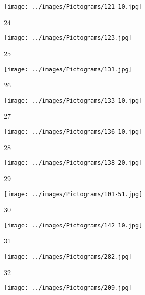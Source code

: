 \begin{figure}[H]
\begin{subfigure}[b]{0.1\textwidth}
  \centering
  \texttt{[image: ../images/Pictograms/121-10.jpg]}
  \caption{24}
\end{subfigure}
\hspace{3em}%
\begin{subfigure}[b]{0.1\textwidth}
  \centering
  \texttt{[image: ../images/Pictograms/123.jpg]}
  \caption{25}
\end{subfigure}
\hspace{3em}%
\begin{subfigure}[b]{0.1\textwidth}
  \centering
  \texttt{[image: ../images/Pictograms/131.jpg]}
  \caption{26}
\end{subfigure}
\hspace{3em}%
\begin{subfigure}[b]{0.1\textwidth}
\centering
\texttt{[image: ../images/Pictograms/133-10.jpg]}
\caption{27}
\end{subfigure}
\hspace{3em}%
\begin{subfigure}[b]{0.1\textwidth}
 \centering
 \texttt{[image: ../images/Pictograms/136-10.jpg]}
 \caption{28}
\end{subfigure}
\hspace{3em}%
\begin{subfigure}[b]{0.1\textwidth}
 \centering
 \texttt{[image: ../images/Pictograms/138-20.jpg]}
 \caption{29}
\end{subfigure}
\hspace{3em}%
\begin{subfigure}[b]{0.1\textwidth}
 \centering
 \texttt{[image: ../images/Pictograms/101-51.jpg]}
 \caption{30}
\end{subfigure}
\hspace{3em}%
\begin{subfigure}[b]{0.1\textwidth}
\centering
\texttt{[image: ../images/Pictograms/142-10.jpg]}
\caption{31}
\end{subfigure}
\hspace{3em}%
\begin{subfigure}[b]{0.1\textwidth}
\centering
\texttt{[image: ../images/Pictograms/282.jpg]}
\caption{32}
\end{subfigure}
\hspace{3em}%
\begin{subfigure}[b]{0.1\textwidth}
\centering
\texttt{[image: ../images/Pictograms/209.jpg]}

\end{subfigure}
\end{figure}
